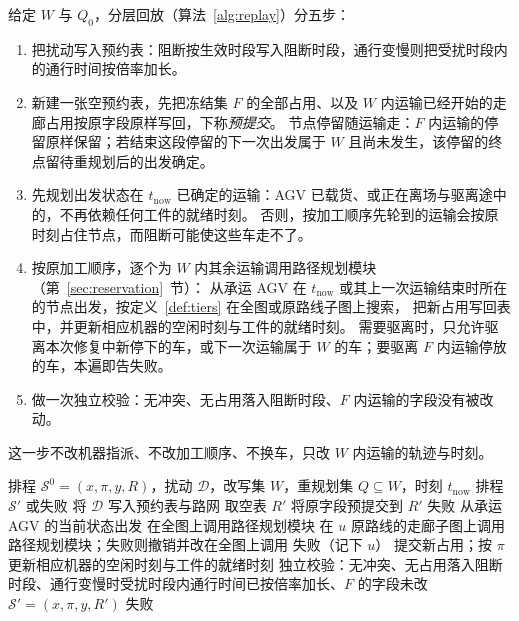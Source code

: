 \documentclass[manuscript,screen,review]{acmart}
\begin{document}
给定 \(W\) 与 \(Q_0\)，分层回放（算法~\ref{alg:replay}）分五步：
\begin{enumerate}[label=(\arabic*),leftmargin=2em,itemsep=0.15em]
\item 把扰动写入预约表：阻断按生效时段写入阻断时段，通行变慢则把受扰时段内的通行时间按倍率加长。
\item 新建一张空预约表，先把冻结集 \(F\) 的全部占用、以及 \(W\) 内运输已经开始的走廊占用按原字段原样写回，下称\emph{预提交}。
节点停留随运输走：\(F\) 内运输的停留原样保留；若结束这段停留的下一次出发属于 \(W\) 且尚未发生，该停留的终点留待重规划后的出发确定。
\item 先规划出发状态在 \(t_{\mathrm{now}}\) 已确定的运输：AGV 已载货、或正在离场与驱离途中的，不再依赖任何工件的就绪时刻。
否则，按加工顺序先轮到的运输会按原时刻占住节点，而阻断可能使这些车走不了。
\item 按原加工顺序，逐个为 \(W\) 内其余运输调用路径规划模块（第~\ref{sec:reservation}~节）：
从承运 AGV 在 \(t_{\mathrm{now}}\) 或其上一次运输结束时所在的节点出发，按定义~\ref{def:tiers} 在全图或原路线子图上搜索，
把新占用写回表中，并更新相应机器的空闲时刻与工件的就绪时刻。
需要驱离时，只允许驱离本次修复中新停下的车，或下一次运输属于 \(W\) 的车；要驱离 \(F\) 内运输停放的车，本遍即告失败。
\item 做一次独立校验：无冲突、无占用落入阻断时段、\(F\) 内运输的字段没有被改动。
\end{enumerate}
这一步不改机器指派、不改加工顺序、不换车，只改 \(W\) 内运输的轨迹与时刻。

\begin{algorithm}[t]
\caption{分层回放 \(\textsc{LayeredReplay}\)}
\label{alg:replay}
\begin{algorithmic}[1]
\Require 排程 \(\mathcal{S}^0=(x,\pi,y,R)\)，扰动 \(\mathcal{D}\)，改写集 \(W\)，重规划集 \(Q\subseteq W\)，时刻 \(t_{\mathrm{now}}\)
\Ensure 排程 \(\mathcal{S}'\) 或失败
\State 将 \(\mathcal{D}\) 写入预约表与路网
\State 取空表 \(R'\)
  \State 将原字段预提交到 \(R'\)
    \State \Return 失败
  \EndIf
\EndFor
{}
  \State 从承运 AGV 的当前状态出发
    \State 在全图上调用路径规划模块
  \Else
    \State 在 \(u\) 原路线的走廊子图上调用路径规划模块；失败则撤销并改在全图上调用 
  \EndIf
    \State \Return 失败（记下 \(u\)）
  \EndIf
  \State 提交新占用；按 \(\pi\) 更新相应机器的空闲时刻与工件的就绪时刻
\EndFor
\State 独立校验：无冲突、无占用落入阻断时段、通行变慢时受扰时段内通行时间已按倍率加长、\(F\) 的字段未改
  \State \Return \(\mathcal{S}'=(x,\pi,y,R')\)
\Else
  \State \Return 失败
\EndIf
\end{algorithmic}
\end{algorithm}
\end{document}
